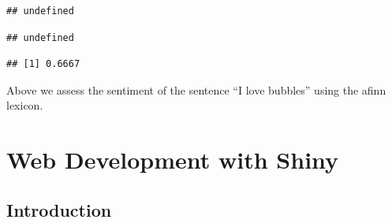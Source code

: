 \documentclass[
]{krantz}
\makeatletter
\newenvironment{Shaded}{\begin{snugshade}}{\end{snugshade}}
\newcommand{\KeywordTok}[1]{\textcolor[rgb]{0.27,0.27,0.27}{\textbf{#1}}}
\newcommand{\NormalTok}[1]{#1}
\newcommand{\OperatorTok}[1]{\textcolor[rgb]{0.43,0.43,0.43}{\textbf{#1}}}
\newcommand{\StringTok}[1]{\textcolor[rgb]{0.5,0.5,0.5}{#1}}
\newenvironment{kframe}{%
\medskip{}
\setlength{\fboxsep}{.8em}
 \def\at@end@of@kframe{}%
 \ifinner\ifhmode%
  \def\at@end@of@kframe{\end{minipage}}%
  \begin{minipage}{\columnwidth}%
 \fi\fi%
 \def\FrameCommand##1{\hskip\@totalleftmargin \hskip-\fboxsep
 \colorbox{shadecolor}{##1}\hskip-\fboxsep
     \hskip-\linewidth \hskip-\@totalleftmargin \hskip\columnwidth}%
 \MakeFramed {\advance\hsize-\width
   \@totalleftmargin\z@ \linewidth\hsize
   \@setminipage}}%
 {\par\unskip\endMakeFramed%
 \at@end@of@kframe}
\renewenvironment{Shaded}{\begin{kframe}}{\end{kframe}}
\makeatother
\begin{document}
\begin{Shaded}
\end{Shaded}

\begin{verbatim}
## undefined
\end{verbatim}

\begin{Shaded}
\end{Shaded}

\begin{verbatim}
## undefined
\end{verbatim}

\begin{Shaded}
\end{Shaded}

\begin{verbatim}
## [1] 0.6667
\end{verbatim}

Above we assess the sentiment of the sentence ``I love bubbles'' using the afinn lexicon.

\hypertarget{part-web-development-with-shiny}{%
\part{Web Development with Shiny}\label{part-web-development-with-shiny}}

\hypertarget{introduction-1}{%
\chapter{Introduction}\label{introduction-1}}
\end{document}
